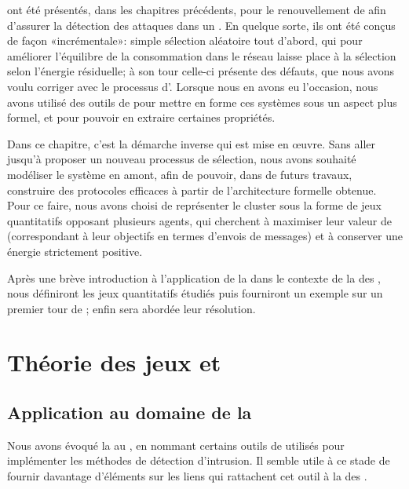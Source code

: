 \vfill
{} ont été présentés, dans les chapitres précédents, pour le renouvellement de \cns afin d'assurer la détection des attaques dans un \rcsf.
En quelque sorte, ils ont été conçus de façon «incrémentale»: simple sélection aléatoire tout d'abord, qui pour améliorer l'équilibre de la consommation dans le réseau laisse place à la sélection selon l'énergie résiduelle; à son tour celle-ci présente des défauts, que nous avons voulu corriger avec le processus d'\elecdem.
Lorsque nous en avons eu l'occasion, nous avons utilisé des outils de  pour mettre en forme ces systèmes sous un aspect plus formel, et pour pouvoir en extraire certaines propriétés.

Dans ce chapitre, c'est la démarche inverse qui est mise en œuvre.
Sans aller jusqu'à proposer un nouveau processus de sélection, nous avons souhaité modéliser le système en amont, afin de pouvoir, dans de futurs travaux, construire des protocoles efficaces à partir de l'architecture formelle obtenue.
Pour ce faire, nous avons choisi de représenter le cluster sous la forme de jeux quantitatifs opposant plusieurs agents, qui cherchent à maximiser leur valeur de  (correspondant à leur objectifs en termes d'envois de messages) et à conserver une énergie strictement positive.

Après une brève introduction à l'application de la  dans le contexte de la \secu des \rcs, nous définiront les jeux quantitatifs étudiés puis fourniront un exemple sur un premier tour de ; enfin sera abordée leur résolution.
\pagebreak %

\section{Théorie des jeux et \rcs}

    \subsection{Application au domaine de la \secu}
Nous avons évoqué la  au , en nommant certains outils de  utilisés pour implémenter les méthodes de détection d'intrusion.
Il semble utile à ce stade de fournir davantage d'éléments sur les liens qui rattachent cet outil à la \secu des \rcsfs.


